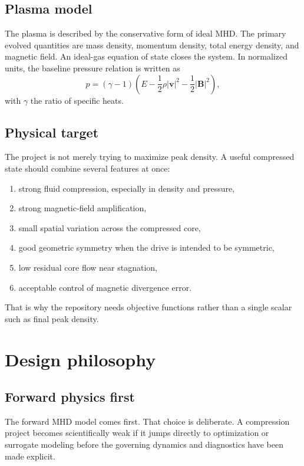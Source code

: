 \documentclass[11pt]{article}
\begin{document}
\subsection{Plasma model}
The plasma is described by the conservative form of ideal MHD. The primary evolved quantities are mass density, momentum density, total energy density, and magnetic field. An ideal-gas equation of state closes the system. In normalized units, the baseline pressure relation is written as
\[
p = (\gamma-1)\left(E - \frac{1}{2}\rho |\mathbf{v}|^2 - \frac{1}{2}|\mathbf{B}|^2\right),
\]
with $\gamma$ the ratio of specific heats.

\subsection{Physical target}
The project is not merely trying to maximize peak density. A useful compressed state should combine several features at once:
\begin{enumerate}[leftmargin=1.8em]
    \item strong fluid compression, especially in density and pressure,
    \item strong magnetic-field amplification,
    \item small spatial variation across the compressed core,
    \item good geometric symmetry when the drive is intended to be symmetric,
    \item low residual core flow near stagnation,
    \item acceptable control of magnetic divergence error.
\end{enumerate}
That is why the repository needs objective functions rather than a single scalar such as final peak density.

\section{Design philosophy}
\subsection{Forward physics first}
The forward MHD model comes first. That choice is deliberate. A compression project becomes scientifically weak if it jumps directly to optimization or surrogate modeling before the governing dynamics and diagnostics have been made explicit.
\end{document}
